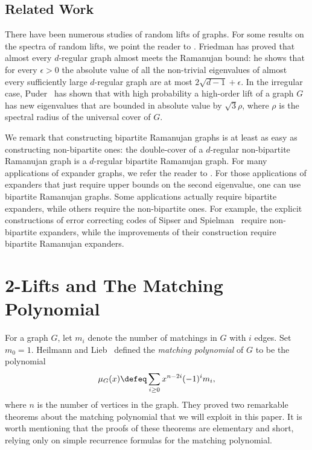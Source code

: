 \documentclass[11pt]{article}
\begin{document}
\subsection{Related Work} \label{sec:related}

There have been numerous studies of random lifts of graphs.
For some results on the spectra of random lifts, we point the reader to
  \cite{amit2002random,linial2005random,amit2006random,linial2010word,addario2010spectrum,lubetzky2011spectra}.
Friedman \cite{friedman2008} has proved that almost every $d$-regular graph almost meets the
  Ramanujan bound: he shows that for every $\epsilon > 0$
  the absolute value of all the non-trivial eigenvalues of
   almost every sufficiently large
  $d$-regular graph are at most $2 \sqrt{d-1} + \epsilon$.
In the irregular case, Puder~\cite{puder2012expansion}
  has shown that with high probability a high-order lift of a graph $G$ 
  has new eigenvalues that are bounded in absolute value by $\sqrt{3}\rho$,
  where $\rho$ is the spectral radius of the universal cover of $G$.

We remark that constructing bipartite Ramanujan graphs is at least as easy
  as constructing non-bipartite ones:
  the double-cover of a $d$-regular non-bipartite Ramanujan graph
  is a $d$-regular bipartite Ramanujan graph.
For many applications of expander graphs, we refer the reader to
  \cite{hoory2006expander}.
For those applications of expanders that just require upper bounds on the
  second eigenvalue, one can use bipartite Ramanujan graphs.
Some applications actually require bipartite expanders, while
  others require the non-bipartite ones.
For example, the explicit constructions of error correcting codes of
  Sipser and Spielman~\cite{sipserSpielman} require non-bipartite expanders,
  while the improvements of their construction 
 \cite{zemor2001expander,roth2006improved,ashikhmin2006decoding}
  require bipartite Ramanujan expanders.


\section{2-Lifts and The Matching Polynomial}\label{sec:matching}

For a graph $G$, let $m_{i}$ denote the number of matchings in $G$ with $i$ edges.
Set $m_{0} = 1$.
Heilmann and Lieb~\cite{HeilmannLieb} defined the \textit{matching polynomial} of $G$
  to be the polynomial
\[
  \mu_{G} (x) \defeq \sum_{i\geq 0} x^{n-2i} (-1)^{i} m_{i},
\]
where $n$ is the number of vertices in the graph.
They proved two remarkable theorems about the matching polynomial that we will exploit
  in this paper.
It is worth mentioning that the proofs of these theorems are elementary and short, relying
  only on simple recurrence formulas for the matching polynomial.
\end{document}
